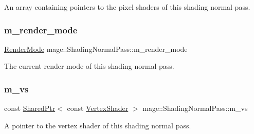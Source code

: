 An array containing pointers to the pixel shaders of this shading normal pass. \hypertarget{classmage_1_1_shading_normal_pass_a0048886bc80b9b39c1dc5d17e5b68584}{}\label{classmage_1_1_shading_normal_pass_a0048886bc80b9b39c1dc5d17e5b68584} 
\subsubsection{\texorpdfstring{m\+\_\+render\+\_\+mode}{m\_render\_mode}}
{\footnotesize\ttfamily \hyperlink{namespacemage_a9d24b35ed0bdecf8535e2b91fe0eebba}{Render\+Mode} mage\+::\+Shading\+Normal\+Pass\+::m\+\_\+render\+\_\+mode\hspace{0.3cm}{\ttfamily [private]}}

The current render mode of this shading normal pass. \hypertarget{classmage_1_1_shading_normal_pass_a75c60d2d17deb2b87d97a094e4be7aa1}{}\label{classmage_1_1_shading_normal_pass_a75c60d2d17deb2b87d97a094e4be7aa1} 
\subsubsection{\texorpdfstring{m\+\_\+vs}{m\_vs}}
{\footnotesize\ttfamily const \hyperlink{namespacemage_a1e01ae66713838a7a67d30e44c67703e}{Shared\+Ptr}$<$ const \hyperlink{classmage_1_1_vertex_shader}{Vertex\+Shader} $>$ mage\+::\+Shading\+Normal\+Pass\+::m\+\_\+vs\hspace{0.3cm}{\ttfamily [private]}}

A pointer to the vertex shader of this shading normal pass. 